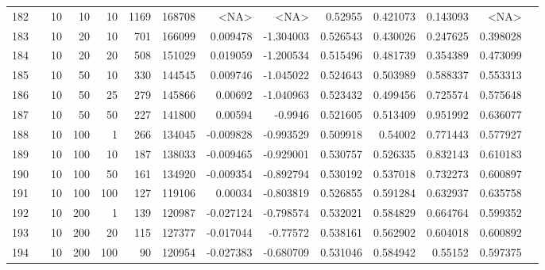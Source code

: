 \begin{longtable}{llrrrrrrrrrrrr}
		182 & &           10 &                10 &           10 &          1169 &     168708 &      <NA> &      <NA> &   0.52955 &    0.421073 &       0.143093 &  <NA> \\
		183 & &           10 &                20 &           10 &         701 &     166099 &  0.009478 & -1.304003 &  0.526543 &    0.430026 &       0.247625 &  0.398028 \\
		184 & &           10 &                20 &           20 &         508 &     151029 &  0.019059 & -1.200534 &  0.515496 &    0.481739 &       0.354389 &  0.473099 \\
		185 & &           10 &                50 &           10 &         330 &     144545 &  0.009746 & -1.045022 &  0.524643 &    0.503989 &       0.588337 &  0.553313 \\
		186 & &           10 &                50 &           25 &         279 &     145866 &   0.00692 & -1.040963 &  0.523432 &    0.499456 &       0.725574 &  0.575648 \\
		187 & &           10 &                50 &           50 &         227 &     141800 &   0.00594 &   -0.9946 &  0.521605 &    0.513409 &       0.951992 &  0.636077 \\
		188 & &           10 &               100 &            1 &         266 &     134045 & -0.009828 & -0.993529 &  0.509918 &     0.54002 &       0.771443 &  0.577927 \\
		189 & &           10 &               100 &           10 &         187 &     138033 & -0.009465 & -0.929001 &  0.530757 &    0.526335 &       0.832143 &  0.610183 \\
		190 & &           10 &               100 &           50 &         161 &     134920 & -0.009354 & -0.892794 &  0.530192 &    0.537018 &       0.732273 &  0.600897 \\
		191 & &           10 &               100 &          100 &         127 &     119106 &   0.00034 & -0.803819 &  0.526855 &    0.591284 &       0.632937 &  0.635758 \\
		192 & &           10 &               200 &            1 &         139 &     120987 & -0.027124 & -0.798574 &  0.532021 &    0.584829 &       0.664764 &  0.599352 \\
		193 & &           10 &               200 &           20 &         115 &     127377 & -0.017044 &  -0.77572 &  0.538161 &    0.562902 &       0.604018 &  0.600892 \\
		194 & &           10 &               200 &          100 &          90 &     120954 & -0.027383 & -0.680709 &  0.531046 &    0.584942 &        0.55152 &  0.597375 \\

\end{longtable}
